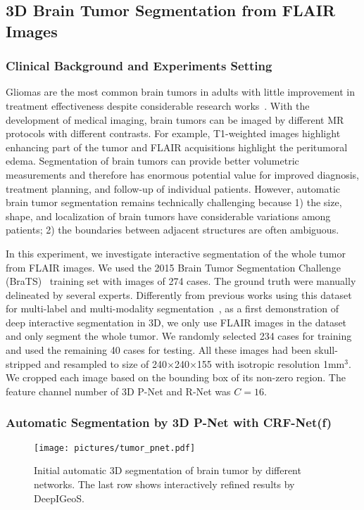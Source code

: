 \documentclass[10pt,journal,compsoc]{IEEEtran}
\begin{document}
\subsection{3D Brain Tumor Segmentation from FLAIR Images }
\subsubsection{Clinical Background and Experiments Setting}
Gliomas are the most common brain tumors in adults with little improvement in treatment effectiveness despite considerable research works~\cite{Menze2015a}. With the development of medical imaging, brain tumors can be imaged by different MR protocols with different contrasts. For example, T1-weighted images highlight enhancing part of the tumor and FLAIR acquisitions highlight the peritumoral edema. Segmentation of brain tumors can provide better volumetric measurements and therefore has enormous potential value for improved diagnosis, treatment planning, and follow-up of individual patients. However, automatic brain tumor segmentation remains technically challenging because 1) the size, shape, and localization of brain tumors have considerable variations among patients; 2) the boundaries between adjacent structures are often ambiguous. 

In this experiment, we investigate interactive segmentation of the whole tumor from FLAIR images. We used the 2015 Brain Tumor Segmentation Challenge (BraTS)~\cite{Menze2015a} training set with images of 274 cases. The ground truth were manually delineated by several experts. Differently from previous works using this dataset for multi-label and multi-modality segmentation~\cite{Kamnitsas2017,Fidon2017a}, as a first demonstration of deep interactive segmentation in 3D, we only use FLAIR images in the dataset and only segment the whole tumor. We randomly selected 234 cases for training and used the remaining 40 cases for testing. All these images had been skull-stripped and resampled to size of 240$\times$240$\times$155 with isotropic resolution 1mm$^3$. We cropped each image based on the bounding box of its non-zero region. The feature channel number of 3D P-Net and R-Net was $C = 16$. 
 
\subsubsection{Automatic Segmentation by 3D P-Net with CRF-Net(f)}

\begin{figure}[t]
	\centering
	\texttt{[image: pictures/tumor\_pnet.pdf]}
	\caption[Initial automatic 3D segmentation of brain tumor]{ 
		Initial automatic 3D segmentation of brain tumor by different networks. %
		The last row shows interactively refined results by DeepIGeoS.
	} 
	\label{fig:tumor_p_net}
\end{figure}
\end{document}
